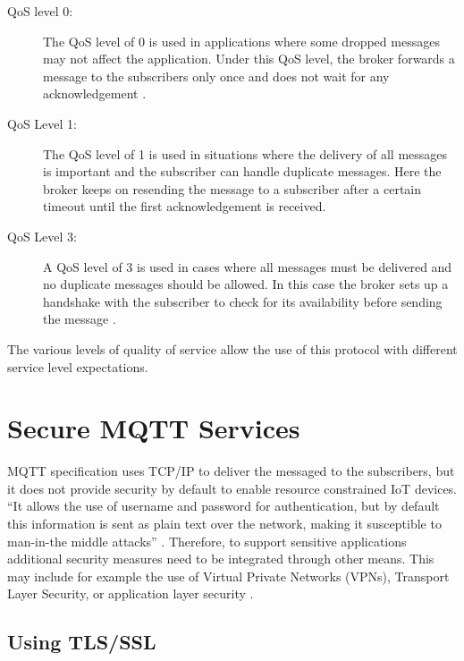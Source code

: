 \begin{description}

\item[QoS level 0:] The QoS level of 0 is used in applications where
  some dropped messages may not affect the application. Under this QoS
  level, the broker forwards a message to the subscribers only once
  and does not wait for any acknowledgement \cite{hivemq-qos}
  \cite{python-paho-mqtt}.

\item[QoS Level 1:] The QoS level of 1 is used in situations where the
  delivery of all messages is important and the subscriber can handle
  duplicate messages. Here the broker keeps on resending the message
  to a subscriber after a certain timeout until the first
  acknowledgement is received.

\item[QoS Level 3:] A QoS level of 3 is used in cases where all
  messages must be delivered and no duplicate messages should be
  allowed. In this case the broker sets up a handshake with the
  subscriber to check for its availability before sending the message
  \cite{hivemq-qos,python-paho-mqtt}.

\end{description}

The various levels of quality of service allow the use of this
protocol with different service level expectations.

\section{Secure MQTT Services}

MQTT specification uses TCP/IP to deliver the messaged to the
subscribers, but it does not provide security by default to enable
resource constrained IoT devices. ``It allows the use of username and
password for authentication, but by default this information is sent
as plain text over the network, making it susceptible to man-in-the
middle attacks''
\cite{iot-design-mqtt-security,mqtt-sec-ssl}. Therefore, to support
sensitive applications additional security measures need to be
integrated through other means. This may include for example the use
of Virtual Private Networks (VPNs), Transport Layer Security, or
application layer security \cite{mqtt-sec-ssl}.

\subsection{Using TLS/SSL}

